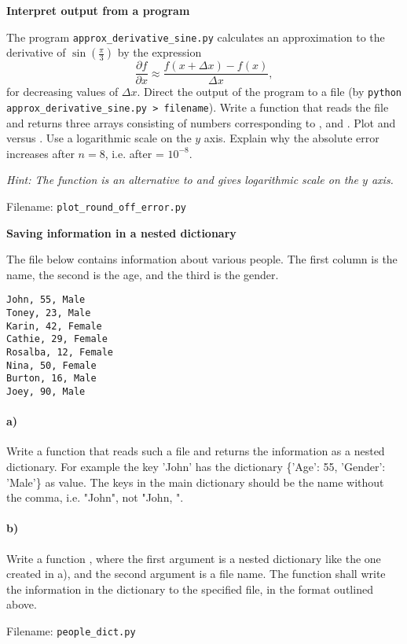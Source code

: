 \begin{Problem}{\textbf{Interpret output from a program}}

\noindent The program \texttt{approx\_derivative\_sine.py} calculates an approximation to the derivative of $\sin\left(\frac{\pi}{3} \right)$ by the expression
\begin{equation*}
    \frac{\partial f}{\partial x} \approx \frac{f(x + \Delta x ) - f(x)}{\Delta x} ,
\end{equation*}
for decreasing values of $\Delta x$. Direct the output of the program to a file (by \texttt{python approx\_derivative\_sine.py > filename}). Write a function that reads the file and returns three arrays consisting of numbers corresponding to ,  and . Plot  and  versus . Use a logarithmic scale on the $y$ axis. Explain why the absolute error increases after $n=8$, i.e. after  = $10^{-8}$.


\emph{Hint: The function  is an alternative to  and gives logarithmic scale on the $y$ axis.}

Filename: \texttt{plot\_round\_off\_error.py}
\end{Problem}


\begin{Problem}{\textbf{Saving information in a nested dictionary}}\label{people_dict}

\noindent The file below contains information about various people. The first column is
the name, the second is the age, and the third is the gender.
\begin{lstlisting}
John, 55, Male
Toney, 23, Male
Karin, 42, Female
Cathie, 29, Female
Rosalba, 12, Female
Nina, 50, Female
Burton, 16, Male
Joey, 90, Male
\end{lstlisting}
\paragraph{a)}
Write a function  that reads such a file and
returns the information as a nested dictionary. For example the key 'John' has the dictionary
\{'Age': 55, 'Gender': 'Male'\} as value.
The keys in the main dictionary should be the name without the comma, i.e. "John",
not "John, ".
\paragraph{b)}
Write a function , where the first argument
is a nested dictionary like the one created in a), and the second argument is a file name.
The function shall write the information in the dictionary to the specified file,
in the format outlined above.

Filename: \texttt{people\_dict.py}
\end{Problem}

